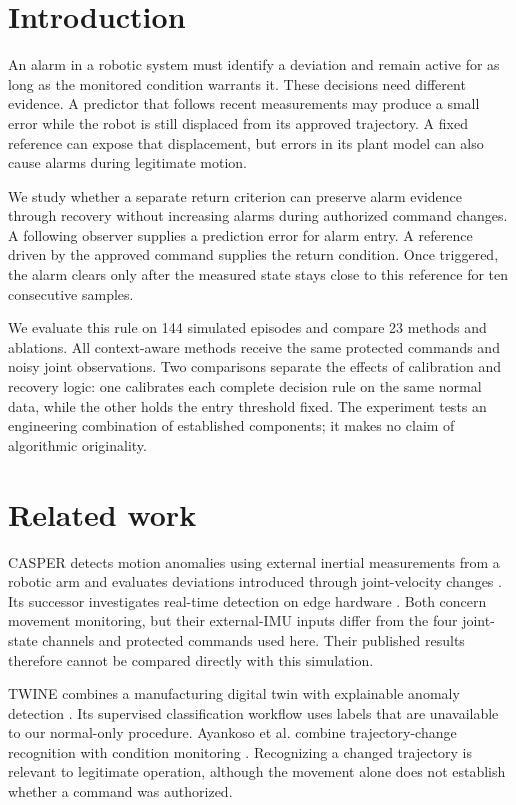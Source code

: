 \section{Introduction}
An alarm in a robotic system must identify a deviation and remain active for as long as the monitored condition warrants it. These decisions need different evidence. A predictor that follows recent measurements may produce a small error while the robot is still displaced from its approved trajectory. A fixed reference can expose that displacement, but errors in its plant model can also cause alarms during legitimate motion.

We study whether a separate return criterion can preserve alarm evidence through recovery without increasing alarms during authorized command changes. A following observer supplies a prediction error for alarm entry. A reference driven by the approved command supplies the return condition. Once triggered, the alarm clears only after the measured state stays close to this reference for ten consecutive samples.

We evaluate this rule on 144 simulated episodes and compare 23 methods and ablations. All context-aware methods receive the same protected commands and noisy joint observations. Two comparisons separate the effects of calibration and recovery logic: one calibrates each complete decision rule on the same normal data, while the other holds the entry threshold fixed. The experiment tests an engineering combination of established components; it makes no claim of algorithmic originality.

\section{Related work}
CASPER detects motion anomalies using external inertial measurements from a robotic arm and evaluates deviations introduced through joint-velocity changes \cite{casper}. Its successor investigates real-time detection on edge hardware \cite{edge}. Both concern movement monitoring, but their external-IMU inputs differ from the four joint-state channels and protected commands used here. Their published results therefore cannot be compared directly with this simulation.

TWINE combines a manufacturing digital twin with explainable anomaly detection \cite{twine}. Its supervised classification workflow uses labels that are unavailable to our normal-only procedure. Ayankoso et al. combine trajectory-change recognition with condition monitoring \cite{ayankoso}. Recognizing a changed trajectory is relevant to legitimate operation, although the movement alone does not establish whether a command was authorized.

